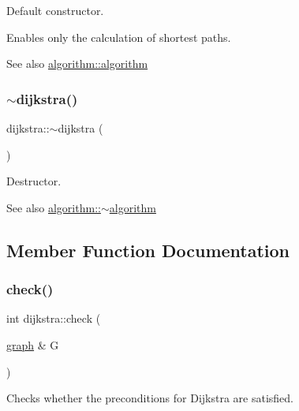 Default constructor. 

Enables only the calculation of shortest paths.

\begin{DoxySeeAlso}{See also}
\mbox{\hyperlink{classalgorithm_ab79e1ddec2f2afdf4b36b10724db8b15}{algorithm\+::algorithm}} 
\end{DoxySeeAlso}
\mbox{\label{classdijkstra_a871e3c8097b7f0bc17358473b1149515}} 
\subsubsection{\texorpdfstring{$\sim$dijkstra()}{~dijkstra()}}
{\footnotesize\ttfamily dijkstra\+::$\sim$dijkstra (\begin{DoxyParamCaption}{ }\end{DoxyParamCaption})\hspace{0.3cm}{\ttfamily [virtual]}}



Destructor. 

\begin{DoxySeeAlso}{See also}
\mbox{\hyperlink{classalgorithm_adca9b1e7fa3afd914519a9dbb44e9fd5}{algorithm\+::$\sim$algorithm}} 
\end{DoxySeeAlso}


\subsection{Member Function Documentation}
\mbox{\label{classdijkstra_a51ff4657e0ddb1ca5231a21e6dea1808}} 
\subsubsection{\texorpdfstring{check()}{check()}}
{\footnotesize\ttfamily int dijkstra\+::check (\begin{DoxyParamCaption}\item[{\mbox{\hyperlink{classgraph}{graph}} \&}]{G }\end{DoxyParamCaption})\hspace{0.3cm}{\ttfamily [virtual]}}



Checks whether the preconditions for Dijkstra are satisfied. 

